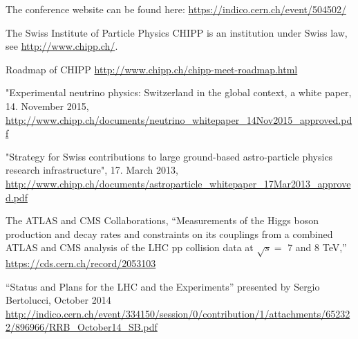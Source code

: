 \singlespacing

\begin{thebibliography}{100}
 The conference website can be found here: \url{https://indico.cern.ch/event/504502/}

 The Swiss Institute of Particle Physics CHIPP is an institution under Swiss law, see \url{http://www.chipp.ch/}.

  Roadmap of CHIPP \url{http://www.chipp.ch/chipp-meet-roadmap.html}


  "Experimental neutrino physics: Switzerland in the global context, a white paper, 14. November 2015, 
\url{http://www.chipp.ch/documents/neutrino_whitepaper_14Nov2015_approved.pdf}

 "Strategy for Swiss contributions to large ground-based astro-particle physics research infrastructure", 17. March 2013, 
\url{http://www.chipp.ch/documents/astroparticle_whitepaper_17Mar2013_approved.pdf}


The ATLAS and CMS Collaborations,
  ``Measurements of the Higgs boson production and decay rates and constraints on its couplings from a combined ATLAS and CMS analysis of the LHC pp collision data at $\sqrt{s} =$ 7 and 8 TeV,''
  \url{https://cds.cern.ch/record/2053103}

 ``Status and Plans for the LHC and the Experiments'' presented by Sergio Bertolucci, October 2014\\
\url{http://indico.cern.ch/event/334150/session/0/contribution/1/attachments/652322/896966/RRB_October14_SB.pdf}

\end{thebibliography}
\newpage{\pagestyle{empty}\cleardoublepage}
